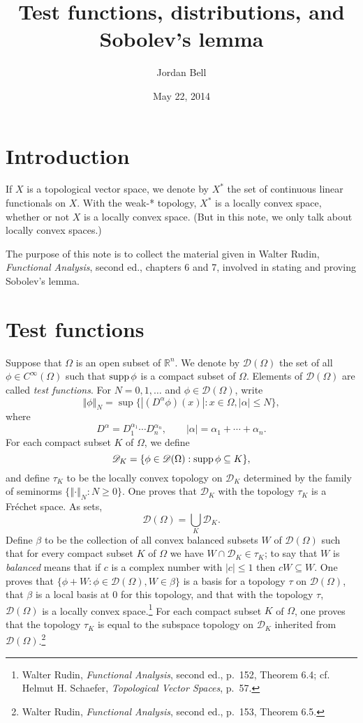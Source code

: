 \documentclass{article}
\newcommand{\supp}{\ensuremath\mathrm{supp}\,}
\newcommand{\norm}[1]{\left\Vert #1 \right\Vert}
\theoremstyle{definition}
\begin{document}
\title{Test functions, distributions, and Sobolev's lemma}
\author{Jordan Bell}
\date{May 22, 2014}

\maketitle

\section{Introduction}
If $X$ is a topological vector space, we denote by $X^*$ the set of continuous linear functionals on $X$. With the weak-* topology, $X^*$ is a locally convex space, whether or not
$X$ is a locally convex space. (But in this note, we only talk about locally convex spaces.)

The purpose of this note is to collect the material given in Walter Rudin, {\em Functional Analysis}, second ed., chapters 6 and 7,
 involved in stating and proving Sobolev's lemma.
 


\section{Test functions}
Suppose that $\Omega$ is an open subset of $\mathbb{R}^n$. We denote by $\mathscr{D}(\Omega)$ the set of all $\phi \in C^\infty(\Omega)$ such that
$\supp \phi$ is a compact subset of $\Omega$. Elements of $\mathscr{D}(\Omega)$ are called {\em test functions}. For $N=0,1,\ldots$ and $\phi \in \mathscr{D}(\Omega)$, write
\[
\norm{\phi}_N = \sup\{|(D^\alpha \phi)(x)|: x\in \Omega, |\alpha| \leq N\},
\]
where
\[
D^\alpha = D_1^{\alpha_1} \cdots D_n^{\alpha_n}, \qquad |\alpha| = \alpha_1 + \cdots + \alpha_n.
\]
For each compact
subset $K$ of $\Omega$, we define
\[
\mathscr{D}_K = \{\phi \in \mathscr{D}(\Omega): \supp \phi \subseteq K\},
\] 
and define   $\tau_K$ to be the locally convex topology on $\mathscr{D}_K$ determined by the  family of seminorms $\{\norm{\cdot}_N: N \geq 0\}$. One proves that 
$\mathscr{D}_K$  with the topology $\tau_K$ is a Fr\'echet space. 
As sets,
\[
\mathscr{D}(\Omega)= \bigcup_K \mathscr{D}_K.
\]
Define $\beta$ to be the collection of all convex balanced subsets $W$ of $\mathscr{D}(\Omega)$ such that for every compact subset $K$ of $\Omega$ we have
$W\cap \mathscr{D}_K \in \tau_K$; to say that $W$ is {\em balanced} means that if $c$ is a complex number with $|c| \leq 1$ then
$cW \subseteq W$. One proves that
 $\{\phi+W: \phi \in \mathscr{D}(\Omega), W \in \beta\}$ is a basis for a topology $\tau$ on $\mathscr{D}(\Omega)$,  that  
 $\beta$ is a local basis at $0$ for this topology,
and that with the topology $\tau$,  $\mathscr{D}(\Omega)$ 
is a locally convex space.\footnote{Walter Rudin, {\em Functional Analysis}, second ed., p.~152, Theorem 6.4; cf. Helmut H. Schaefer,
{\em Topological Vector Spaces}, p.~57.} For each compact subset $K$ of $\Omega$,
 one proves that the topology $\tau_K$ is equal to the subspace topology on $\mathscr{D}_K$ inherited from
 $\mathscr{D}(\Omega)$.\footnote{Walter
 Rudin, {\em Functional Analysis}, second ed., p.~153, Theorem 6.5.} 
\end{document}
